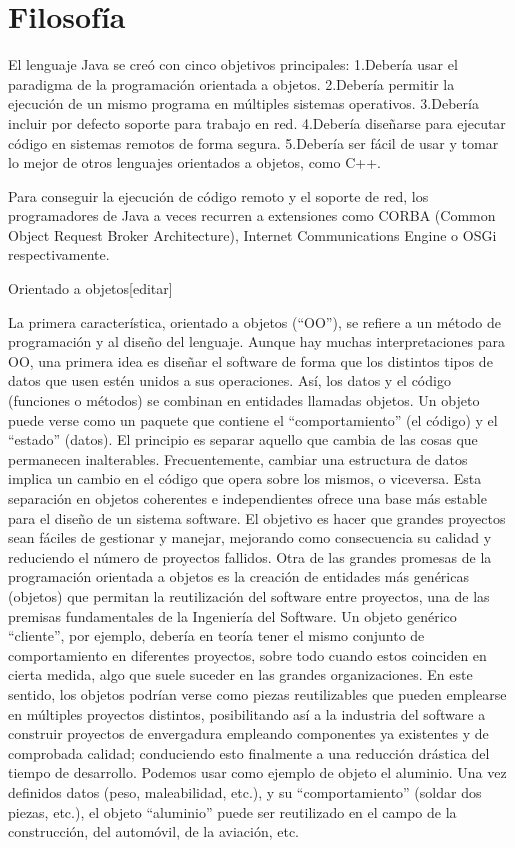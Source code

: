 \documentclass[11pt,a4paper]{$type}
\begin{document}
			\chapter{Filosofía}
												El lenguaje Java se creó con cinco objetivos principales:
	\bigskip
							1.Debería usar el paradigma de la programación orientada a objetos.
	\bigskip
							2.Debería permitir la ejecución de un mismo programa en múltiples sistemas operativos.
	\bigskip
							3.Debería incluir por defecto soporte para trabajo en red.
	\bigskip
							4.Debería diseñarse para ejecutar código en sistemas remotos de forma segura.
	\bigskip
							5.Debería ser fácil de usar y tomar lo mejor de otros lenguajes orientados a objetos, como C++.
	\bigskip
							
	\bigskip
							Para conseguir la ejecución de código remoto y el soporte de red, los programadores de Java a veces recurren a extensiones como CORBA (Common Object Request Broker Architecture), Internet Communications Engine o OSGi respectivamente.
	\bigskip
							
	\bigskip
							Orientado a objetos[editar]
	\bigskip
							
	\bigskip
							La primera característica, orientado a objetos (“OO”), se refiere a un método de programación y al diseño del lenguaje. Aunque hay muchas interpretaciones para OO, una primera idea es diseñar el software de forma que los distintos tipos de datos que usen estén unidos a sus operaciones. Así, los datos y el código (funciones o métodos) se combinan en entidades llamadas objetos. Un objeto puede verse como un paquete que contiene el “comportamiento” (el código) y el “estado” (datos). El principio es separar aquello que cambia de las cosas que permanecen inalterables. Frecuentemente, cambiar una estructura de datos implica un cambio en el código que opera sobre los mismos, o viceversa. Esta separación en objetos coherentes e independientes ofrece una base más estable para el diseño de un sistema software. El objetivo es hacer que grandes proyectos sean fáciles de gestionar y manejar, mejorando como consecuencia su calidad y reduciendo el número de proyectos fallidos. Otra de las grandes promesas de la programación orientada a objetos es la creación de entidades más genéricas (objetos) que permitan la reutilización del software entre proyectos, una de las premisas fundamentales de la Ingeniería del Software. Un objeto genérico “cliente”, por ejemplo, debería en teoría tener el mismo conjunto de comportamiento en diferentes proyectos, sobre todo cuando estos coinciden en cierta medida, algo que suele suceder en las grandes organizaciones. En este sentido, los objetos podrían verse como piezas reutilizables que pueden emplearse en múltiples proyectos distintos, posibilitando así a la industria del software a construir proyectos de envergadura empleando componentes ya existentes y de comprobada calidad; conduciendo esto finalmente a una reducción drástica del tiempo de desarrollo. Podemos usar como ejemplo de objeto el aluminio. Una vez definidos datos (peso, maleabilidad, etc.), y su “comportamiento” (soldar dos piezas, etc.), el objeto “aluminio” puede ser reutilizado en el campo de la construcción, del automóvil, de la aviación, etc.
	\bigskip
							
\end{document}
